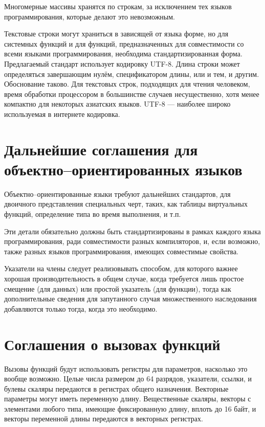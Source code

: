 \documentclass[forwardcom.tex]{subfiles}
\begin{document}
Многомерные массивы хранятся по строкам, за исключением тех языков программирования, которые делают это невозможным.

Текстовые строки могут храниться в зависящей от языка форме, но для системных функций и для функций, предназначенных для совместимости со всеми языками программирования, необходима стандартизированная форма. Предлагаемый стандарт использует кодировку UTF-8. Длина строки может определяться завершающим нулём, спецификатором длины, или и тем, и другим. Обоснование таково. Для текстовых строк, подходящих для чтения человеком, время обработки процессором в большинстве случаев несущественно, хотя менее компактно для некоторых азиатских языков. UTF-8 --- наиболее широко используемая в интернете кодировка.

\section{Дальнейшие соглашения для объектно--ориентированных языков}
Объектно--ориентированные языки требуют дальнейших стандартов, для двоичного представления специальных черт, таких, как таблицы виртуальных функций, определение типа во время выполнения, и т.п.

Эти детали обязательно должны быть стандартизированы в рамках каждого языка программирования, ради совместимости разных компиляторов, и, если возможно, также разных языков программирования, имеющих совместимые свойства.

Указатели на члены следует реализовывать способом, для которого важнее хорошая производительность в общем случае, когда требуется лишь простое смещение (для данных) или простой указатель (для функции), тогда как дополнительные сведения для запутанного случая множественного наследования добавляются только тогда, когда это необходимо.

\section{Соглашения о вызовах функций} \label{functionCallingConventions}
Вызовы функций будут использовать регистры для параметров, насколько это вообще возможно. Целые числа размером до 64 разрядов, указатели, ссылки, и булевы скаляры передаются в регистрах общего назначения. Векторные параметры могут иметь переменную длину. Вещественные скаляры, векторы с элементами любого типа, имеющие фиксированную длину, вплоть до 16 байт, и векторы переменной длины передаются в векторных регистрах.
\end{document}
